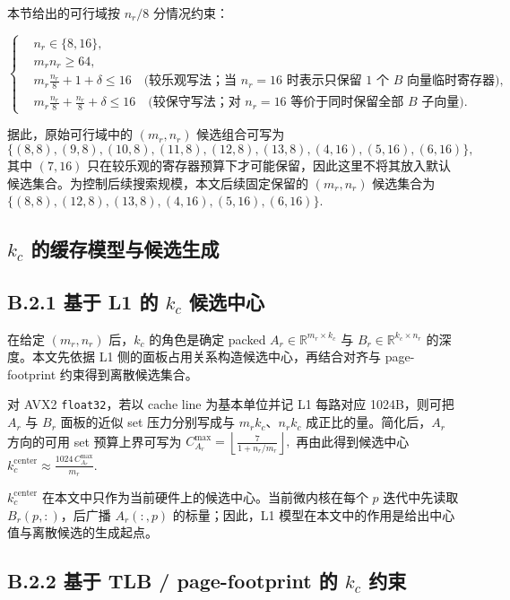 \documentclass[a4paper,11pt,oneside]{article}
\begin{document}
本节给出的可行域按 $n_r/8$ 分情况约束：

$$
\left\{
\begin{aligned}
&n_r \in \{8,16\},\\
&m_r n_r \ge 64,\\
&m_r \frac{n_r}{8} + 1 + \delta \le 16 \quad \text{(较乐观写法；当 } n_r=16 \text{ 时表示只保留 1 个 } B \text{ 向量临时寄存器)},\\
&m_r \frac{n_r}{8} + \frac{n_r}{8} + \delta \le 16 \quad \text{(较保守写法；对 } n_r=16 \text{ 等价于同时保留全部 } B \text{ 子向量)}.
\end{aligned}
\right.
$$

据此，原始可行域中的 $(m_r,n_r)$ 候选组合可写为
$$
\{(8,8),(9,8),(10,8),(11,8),(12,8),(13,8),(4,16),(5,16),(6,16)\},
$$
其中 $(7,16)$ 只在较乐观的寄存器预算下才可能保留，因此这里不将其放入默认候选集合。为控制后续搜索规模，本文后续固定保留的 $(m_r,n_r)$ 候选集合为
$
\{(8,8),(12,8),(13,8),(4,16),(5,16),(6,16)\}.
$

\subsection{$k_c$ 的缓存模型与候选生成}

\subsection*{B.2.1 基于 L1 的 $k_c$ 候选中心}

在给定 $(m_r,n_r)$ 后，$k_c$ 的角色是确定 packed $A_r \in \mathbb{R}^{m_r \times k_c}$ 与 $B_r \in \mathbb{R}^{k_c \times n_r}$ 的深度。本文先依据 L1 侧的面板占用关系构造候选中心，再结合对齐与 page-footprint 约束得到离散候选集合。

对 AVX2 \texttt{float32}，若以 cache line 为基本单位并记 L1 每路对应 1024B，则可把 $A_r$ 与 $B_r$ 面板的近似 set 压力分别写成与 $m_r k_c$、$n_r k_c$ 成正比的量。简化后，$A_r$ 方向的可用 set 预算上界可写为
$
C_{A_r}^{\max}=\left\lfloor \frac{7}{1+n_r/m_r} \right\rfloor,
$
再由此得到候选中心
$
k_c^{\text{center}} \approx \frac{1024\,C_{A_r}^{\max}}{m_r}.
$

$k_c^{\text{center}}$ 在本文中只作为当前硬件上的候选中心。当前微内核在每个 $p$ 迭代中先读取 $B_r(p,:)$，后广播 $A_r(:,p)$ 的标量；因此，L1 模型在本文中的作用是给出中心值与离散候选的生成起点。

\subsection*{B.2.2 基于 TLB / page-footprint 的 $k_c$ 约束}
\end{document}
